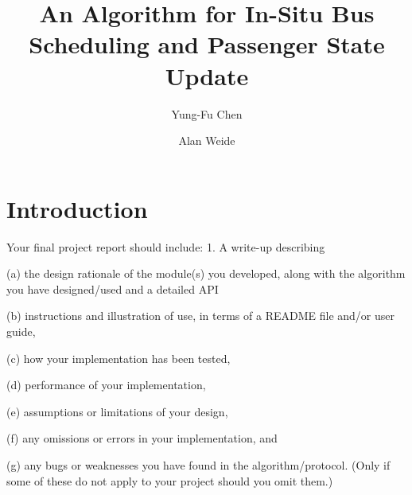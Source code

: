 \documentclass[runningheads]{llncs}
\begin{document}
\mainmatter  %

\title{An Algorithm for In-Situ Bus Scheduling and Passenger State Update}


%
%
\author{Yung-Fu Chen \and Alan Weide}



\maketitle

\renewcommand\thelstlisting{\arabic{lstlisting}}


\section{Introduction}
Your final project report should include:
1. A write-up describing 

(a) the design rationale of the module(s) you developed, along with the algorithm you have designed/used and a detailed API

(b) instructions and illustration of use, in terms of a README file and/or user guide, 

(c) how your implementation has been tested, 

(d) performance of your implementation,

(e) assumptions or limitations of your design,

(f) any omissions or errors in your implementation, and 

(g) any bugs or weaknesses you have found in the algorithm/protocol. (Only if some of these do not apply to your project should you omit them.)
\end{document}
